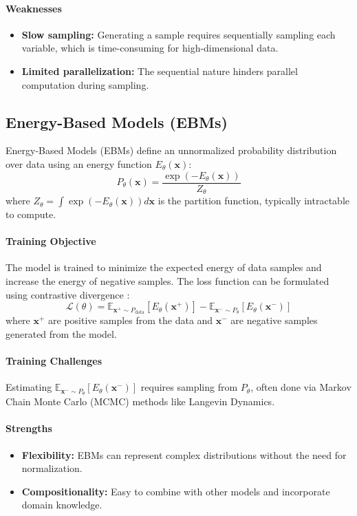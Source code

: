 \paragraph{Weaknesses}
\begin{itemize}
    \item \textbf{Slow sampling:} Generating a sample requires sequentially sampling each variable, which is time-consuming for high-dimensional data.
    \item \textbf{Limited parallelization:} The sequential nature hinders parallel computation during sampling.
\end{itemize}

\subsection{Energy-Based Models (EBMs)}
Energy-Based Models (EBMs) \cite{intro:lecun2006tutorial} define an unnormalized probability distribution over data using an energy function \( E_{\theta}(\mathbf{x}) \):
\[
P_{\theta}(\mathbf{x}) = \frac{\exp(-E_{\theta}(\mathbf{x}))}{Z_{\theta}}
\]
where \( Z_{\theta} = \int \exp(-E_{\theta}(\mathbf{x})) d\mathbf{x} \) is the partition function, typically intractable to compute.

\paragraph{Training Objective}
The model is trained to minimize the expected energy of data samples and increase the energy of negative samples. The loss function can be formulated using contrastive divergence \cite{intro:hinton2002training}:
\[
\mathcal{L}(\theta) = \mathbb{E}_{\mathbf{x}^+ \sim P_{\text{data}}} [E_{\theta}(\mathbf{x}^+)] - \mathbb{E}_{\mathbf{x}^- \sim P_{\theta}} [E_{\theta}(\mathbf{x}^-)]
\]
where \( \mathbf{x}^+ \) are positive samples from the data and \( \mathbf{x}^- \) are negative samples generated from the model.

\paragraph{Training Challenges}
Estimating \( \mathbb{E}_{\mathbf{x}^- \sim P_{\theta}} [E_{\theta}(\mathbf{x}^-)] \) requires sampling from \( P_{\theta} \), often done via Markov Chain Monte Carlo (MCMC) methods like Langevin Dynamics.

\paragraph{Strengths}
\begin{itemize}
    \item \textbf{Flexibility:} EBMs can represent complex distributions without the need for normalization.
    \item \textbf{Compositionality:} Easy to combine with other models and incorporate domain knowledge.
\end{itemize}

